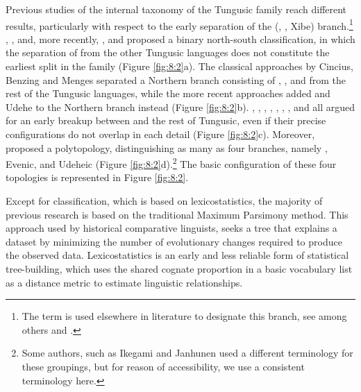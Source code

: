 \documentclass[output=paper,colorlinks,citecolor=brown]{langscibook}
\begin{document}
Previous studies of the internal taxonomy of the Tungusic family reach different results, particularly with respect to the early separation of the  (, , Xibe) branch.\footnote{The term  is used elsewhere in literature to designate this branch, see among others \citet{Fuente2011} and \citet{RobbeetsSavelyev2020}.} \citet{Cincius1949RO}, \citet{Benzing1956}, \citet[27]{Menges1968} and, more recently, \citet{Kormushin1998RO}, \citet{Georg2004} and \citet{Janhunen2012a} proposed a binary north-south classification, in which the separation of  from the other Tungusic languages does not constitute the earliest split in the family (Figure \ref{fig:8:2}a). The classical approaches by Cincius, Benzing and Menges separated a Northern branch consisting of , ,  and  from the rest of the Tungusic languages, while the more recent approaches added  and Udehe to the Northern branch instead (Figure \ref{fig:8:2}b). \citet[333--335]{Sunik1959}, \citet[44]{Vasilevič1960}, \citet[5]{Doerfer1978}, \citet[102]{Vovin1993}, \citet[291]{Whaleyetal1999}, \citet{Robbeets2015}, \citet{RobbeetsBouckaert2018}, \citet{Dybo2019} and \citet{WhaleyOskolskaya2020} all argued for an early breakup between  and the rest of Tungusic, even if their precise configurations do not overlap in each detail (Figure \ref{fig:8:2}c). Moreover, \citet{Ikegami1974RO} proposed a polytopology, distinguishing as many as four branches, namely , Evenic,  and Udeheic (Figure \ref{fig:8:2}d).\footnote{Some authors, such as Ikegami and Janhunen used a different terminology for these groupings, but for reason of accessibility, we use a consistent terminology here.} The basic configuration of these four topologies is represented in Figure \ref{fig:8:2}.

Except for  classification, which is based on lexicostatistics, the majority of previous research is based on the traditional Maximum Parsimony method. This approach used by historical comparative linguists, seeks a tree that explains a dataset by minimizing the number of evolutionary changes required to produce the observed data. Lexicostatistics is an early and less reliable form of statistical tree-building, which uses the shared cognate proportion in a basic vocabulary list as a distance metric to estimate linguistic relationships.
\end{document}
